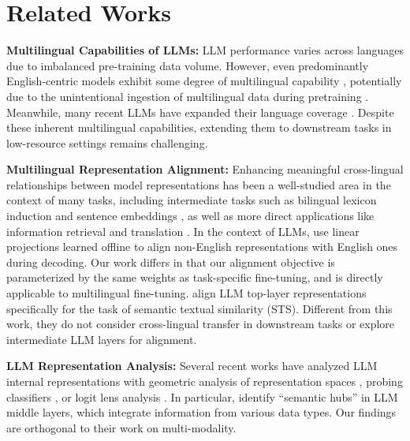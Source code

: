 \section{Related Works}
\textbf{Multilingual Capabilities of LLMs:}
LLM performance varies across languages due to imbalanced pre-training data volume.  
However, even predominantly English-centric models \cite{DBLP:journals/corr/abs-2307-09288} exhibit some degree of multilingual capability \cite{aycock-bawden-2024-topic,yuan-etal-2024-vocabulary},
potentially due to the unintentional ingestion of multilingual data during pretraining \cite{briakou-etal-2023-searching}.
Meanwhile, many recent LLMs have expanded their language coverage \cite{grattafiori2024llama3herdmodels,qwen2025qwen25technicalreport}.
Despite these inherent multilingual capabilities, 
extending them to downstream tasks in low-resource settings \cite{adelani-etal-2024-comparing,iyer-etal-2024-exploring} remains challenging. 

\noindent
\textbf{Multilingual Representation Alignment:}
Enhancing meaningful cross-lingual relationships between model representations has been a well-studied area in the context of many tasks,
including intermediate tasks such as 
bilingual lexicon induction \cite{zhang-etal-2017-adversarial} and
sentence embeddings \cite{feng-etal-2022-language,li-etal-2023-dual},
as well as more direct applications like 
information retrieval \cite{DBLP:journals/tmlr/IzacardCHRBJG22} and translation \cite{pham-etal-2019-improving,pan-etal-2021-contrastive}.
In the context of LLMs, 
\citet{wang2024bridginglanguagegapslarge} 
use linear projections learned offline to align non-English representations with English ones during decoding.
Our work differs in that our alignment objective is parameterized by the same weights as task-specific fine-tuning, 
and is directly applicable to multilingual fine-tuning.
\citet{wu-etal-2024-representational} align LLM top-layer representations specifically for the task of semantic textual similarity (STS).
Different from this work, they do not consider cross-lingual transfer in downstream tasks or explore intermediate LLM layers for alignment.

\noindent
\textbf{LLM Representation Analysis:}
Several recent works have analyzed LLM internal representations with
geometric analysis of representation spaces \cite{razzhigaev-etal-2024-shape,lee2024multimodalfoundationmodelsencode},
probing classifiers \cite{wang-etal-2024-probing-emergence,li2025exploringmultilingualprobinglarge},
or logit lens analysis \cite{wu2024semantichubhypothesislanguage}.
In particular,
\citet{wu2024semantichubhypothesislanguage} identify “semantic hubs” in LLM middle layers, which integrate information from various data types.
Our findings are orthogonal to their work on multi-modality.